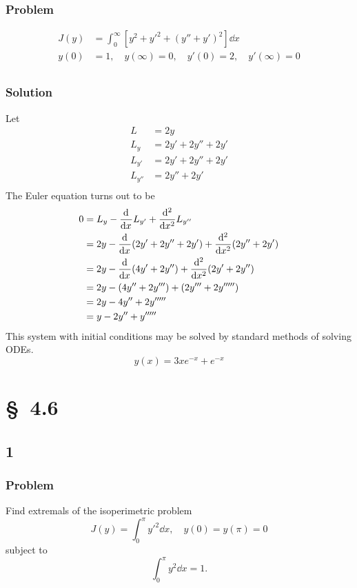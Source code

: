 \documentclass[12pt,twoside]{article}
\begin{document}
\subsubsection*{Problem}
\begin{equation}
  \label{eq:4.4.1e-problem}
  \begin{aligned}
    J(y) &= \int_0^{\infty} [y^2 + {y'}^2 + {(y''+y')}^2]\dd{x} \\
    y(0) &= 1,\quad y(\infty) = 0, \quad y'(0) = 2, \quad y'(\infty) = 0 \\
  \end{aligned}
\end{equation}
\subsubsection*{Solution}
Let
\begin{align*}
  L &= 2y \\
  L_y &= 2y' + 2y'' + 2y' \\
  L_{y'} &= 2y' + 2y'' + 2y' \\
  L_{y''} &= 2y'' + 2y' \\
\end{align*}
The Euler equation turns out to be
\begin{align*}
  0 &= L_y - \od{}{x}L_{y'} + \od[2]{}{x}L_{y''} \\
    &= 2y - \od{}{x}(2y'+2y''+2y') + \od[2]{}{x}(2y''+2y') \\
    &= 2y - \od{}{x}(4y'+2y'') + \od[2]{}{x}(2y'+2y'') \\
    &= 2y - (4y''+2y''') + (2y'''+2y''''') \\
    &= 2y - 4y'' + 2y''''' \\
    &= y - 2y'' + y''''' \\
\end{align*}
This system with initial conditions may be solved by standard methods of solving
ODEs.
\begin{equation*}
  \boxed{y(x) = 3xe^{-x}+e^{-x}}
\end{equation*}

\section{\S~4.6}
\subsection{1}
\subsubsection*{Problem}
Find extremals of the isoperimetric problem
\begin{equation}
  \label{eq:4.6.1-problem}
  J(y) = \int_0^{\pi} {y'}^2\dd{x}, \quad y(0)=y(\pi)=0
\end{equation}
subject to
\begin{equation}
  \label{eq:4.6.1-subject}
  \int_0^{\pi}y^2\dd{x} = 1.
\end{equation}
\end{document}
